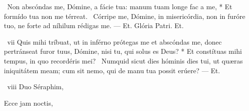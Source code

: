 \R\ Non abscóndas me, Dómine, a fácie tua: manum tuam longe fac a me, * Et formído tua non me térreat. \V\ Córripe me, Dómine, in misericórdia, non in furóre tuo, ne forte ad níhilum rédigas me. — Et. Glória Patri. Et.


\R\ vii Quis mihi tríbuat, ut in inférno prótegas me et abscóndas me, donec pertránseat furor tuus, Dómine, nisi tu, qui solus es Deus? * Et constítuas mihi tempus, in quo recordéris mei? \V\ Numquid sicut dies hóminis dies tui, ut quæras iniquitátem meam; cum sit nemo, qui de manu tua possit erúere? — Et.

\R\ viii Duo Séraphim, 

 Ecce jam noctis, 


